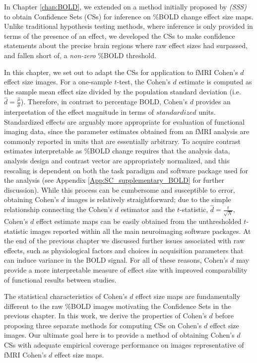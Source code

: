 In Chapter \ref{chap:BOLD}, we extended on a method initially proposed by \textit{\citet*{Sommerfeld2018-zl} (SSS)} to obtain Confidence Sets (CSs) for inference on \%BOLD change effect size maps. Unlike traditional hypothesis testing methods, where inference is only provided in terms of the presence of an effect, we developed the CSs to make confidence statements about the precise brain regions where raw effect sizes had surpassed, and fallen short of, a \textit{non-zero} \%BOLD threshold.

In this chapter, we set out to adapt the CSs for application to fMRI Cohen's $d$ effect size images. For a one-sample $t$-test, the Cohen's $d$ estimate is computed as the sample mean effect size divided by the population standard deviation \Big(i.e.\ $\hat{d} = \frac{\hat{\mu}}{\hat{\sigma}}$\Big). Therefore, in contrast to percentage BOLD, Cohen's $d$ provides an interpretation of the effect magnitude in terms of $standardized$ units. Standardized effects are arguably more appropriate for evaluation of functional imaging data, since the parameter estimates obtained from an fMRI analysis are commonly reported in units that are essentially arbitrary. To acquire contrast estimates interpretable as \%BOLD change requires that the analysis data, analysis design and contrast vector are appropriately normalized, and this rescaling is dependent on both the task paradigm and software package used for the analysis (see Appendix \ref{App:SC_supplementary_BOLD} for further discussion). While this process can be cumbersome and susceptible to error, obtaining Cohen's $d$ images is relatively straightforward; due to the simple relationship connecting the Cohen's $d$ estimator and the $t$-statistic, $\hat{d} = \frac{t}{\sqrt{N}}$, Cohen's $d$ effect estimate maps can be easily obtained from the unthresholded $t$-statistic images reported within all the main neuroimaging software packages. At the end of the previous chapter we discussed further issues associated with raw effects, such as physiological factors and choices in acquisition parameters that can induce variance in the BOLD signal. For all of these reasons, Cohen's $d$ may provide a more interpretable measure of effect size with improved comparability of functional results between studies.

The statistical characteristics of Cohen's $d$ effect size maps are fundamentally different to the raw \%BOLD images motivating the Confidence Sets in the previous chapter. In this work, we derive the properties of Cohen's $d$ before proposing three separate methods for computing CSs on Cohen's $d$ effect size images. Our ultimate goal here is to provide a method of obtaining Cohen's $d$ CSs with adequate empirical coverage performance on images representative of fMRI Cohen's $d$ effect size maps. 

